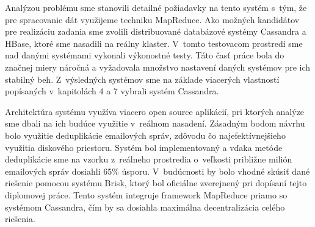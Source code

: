 \documentclass[11pt,twoside,a4paper]{book}
\begin{document}
Analýzou problému sme stanovili detailné požiadavky na tento systém s~tým, že pre spracovanie dát využijeme techniku MapReduce. Ako možných kandidátov pre realizáciu zadania sme zvolili distribuované databázové systémy Cassandra a HBase, ktoré sme nasadili na reálny klaster. V~tomto testovacom prostredí sme nad danými systémami vykonali výkonostné testy. Táto časť práce bola do značnej miery náročná a vyžadovala množstvo nastavení daných systémov pre ich stabilný beh. Z~výsledných systémov sme na základe viacerých vlastností popísaných v~kapitolách 4 a 7 vybrali systém Cassandra.

Architektúra systému využíva viacero open source aplikácií, pri ktorých analýze sme dbali na ich budúce využitie v~reálnom nasadení. Zásadným bodom návrhu bolo využitie deduplikácie emailových správ, zdôvodu čo najefektívnejšieho využitia diskového priestoru. Systém bol implementovaný a vďaka metóde deduplikácie sme na vzorku z~reálneho prostredia o~veľkosti približne milión emailových správ dosiahli 65\% úsporu. V~budúcnosti by bolo vhodné skúsiť dané riešenie pomocou systému Brisk, ktorý bol oficiálne zverejnený pri dopísaní tejto diplomovej práce. Tento systém integruje framework MapReduce priamo so systémom Cassandra, čím by sa dosiahla maximálna decentralizácia celého riešenia.














%
{
\def\CS{$\cal C\kern-0.1667em\lower.5ex\hbox{$\cal S$}\kern-0.075em $}

}

%
\end{document}
